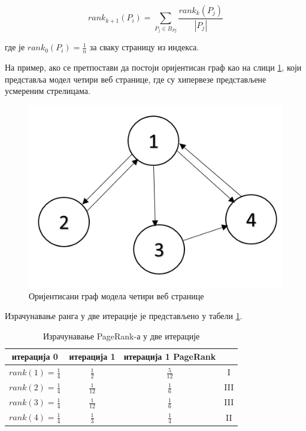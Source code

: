 \begin{equation}\label{eq:rank2}
rank_{k+1}(P_{i})=\sum_{P_{j}\in B_{P{j}}}\frac{rank_{k}(P_{j})}{\left |P_{j}  \right |}
\end{equation}

где је $rank_{0}(P_{i})=\frac{1}{n}$ за сваку страницу из индекса.

На пример, ако се претпостави да постоји оријентисан граф као
на слици \ref{slike:graf}, који представља модел четири веб странице, где су
хипервезе представљене усмереним стрелицама.

\begin{figure}[here]
\centering
\includegraphics[scale=0.6]{graf.png}
\caption{Оријентисани граф модела четири веб странице}
\label{slike:graf}
\end{figure}

Израчунавање ранга у две итерације је представљено у табели \ref{tabele:rank}.

\begin{table}[h]
\centering
\def\arraystretch{1.5}
\begin{tabular}{|c|c|c|c|}\hline
\textbf{итерација 0} & \textbf{итерација 1} & \textbf{итерација 1} \textbf{PageRank}\\ \hline\hline
$rank(1)=\frac{1}{4}$ & $\frac{1}{2}$ & $\frac{5}{12}$ & \textrm{I} \\ \hline
$rank(2)=\frac{1}{4}$ & $\frac{1}{12}$ & $\frac{1}{6}$ & \textrm{III} \\ \hline
$rank(3)=\frac{1}{4}$ & $\frac{1}{12}$ & $\frac{1}{6}$ & \textrm{III} \\ \hline
$rank(4)=\frac{1}{4}$ & $\frac{1}{3}$ & $\frac{1}{4}$ &  \textrm{II}\\ \hline
\end{tabular}
\caption{Израчунавање PageRank-а у две итерације}
\label{tabele:rank}
\end{table}

